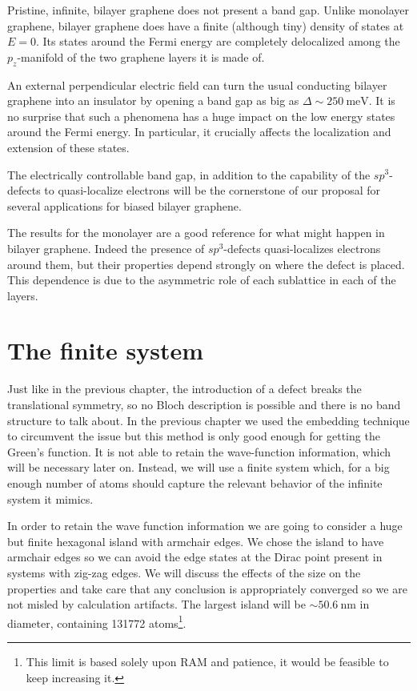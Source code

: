 Pristine, infinite, bilayer graphene does not present a band gap. Unlike monolayer graphene, bilayer graphene does have a finite (although tiny) density of states at $E=0$. Its states around the Fermi energy are completely delocalized among the $p_z$-manifold of the two graphene layers it is made of.

An external perpendicular electric field can turn the usual conducting bilayer graphene into an insulator by opening a band gap as big as\cite{McCann2006, Castro2007, Oostinga2007, Zhang2009, Taychatanapat2010, Castro2010a, Ponomarenko2011, Allen2012, Sui2015} $\Delta\sim\SI{250}{\meV}$.
It is no surprise that such a phenomena has a huge impact on the low energy states around the Fermi energy. In particular, it crucially affects the localization and extension of these states.

The electrically controllable band gap, in addition to the capability of the $sp^3$-defects to quasi-localize electrons will be the cornerstone of our proposal for several applications for biased bilayer graphene.
\medskip



The results for the monolayer are a good reference for what might happen in bilayer graphene. Indeed the presence of $sp^3$-defects quasi-localizes electrons around them, but their properties depend strongly on where the defect is placed. This dependence is due to the asymmetric role of each sublattice in each of the layers.


\section{The finite system}
Just like in the previous chapter, the introduction of a defect breaks the translational symmetry, so no Bloch description is possible and there is no band structure to talk about. In the previous chapter we used the embedding technique to circumvent the issue but this method is only good enough for getting the Green's function. It is not able to retain the wave-function information, which will be necessary later on.
Instead, we will use a finite system which, for a big enough number of atoms should capture the relevant behavior of the infinite system it mimics.
\medskip


In order to retain the wave function information we are going to consider a huge but finite hexagonal island with armchair edges. We chose the island to have armchair edges so we can avoid the edge states at the Dirac point present in systems with zig-zag edges.\cite{Nakada1996}
We will discuss the effects of the size on the properties and take care that any conclusion is appropriately converged so we are not misled by calculation artifacts. The largest island will be $\sim\SI{50.6}{\nm}$ in diameter, containing 131772 atoms\footnote{This limit is based solely upon RAM and patience, it would be feasible to keep increasing it.}.  %


